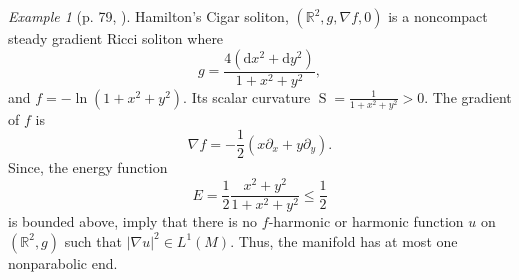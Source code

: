 \documentclass{amsart}
\newcommand{\abs}[1]{\left| #1 \right|}
\newcommand{\derivative}{\mathrm{d}}
\newcommand{\brackets}[1]{\left( #1 \right)}
\DeclareMathOperator*{\scalar}{S}
\theoremstyle{plain}
\theoremstyle{plain}
\newtheorem{corollary}{Corollary}
\theoremstyle{plain}
\theoremstyle{plain}
\theoremstyle{remark}
\newtheorem{example}{Example}
\begin{document}










\begin{example}[p. 79,  \cite{MR4624811}]\label{ex: hamilton cigar soliton}
    Hamilton's Cigar soliton, $(\mathbb{R}^2 , g, \nabla f, 0)$ is a noncompact steady gradient Ricci soliton where 
    $$ g = \frac{ 4 \left( \derivative x^2 + \derivative y^2 \right) }{1+x^2+y^2} , $$
    and $f= - \ln \brackets{ 1+ x^2 + y^2 }$. 
    Its scalar curvature $\scalar = \frac{1}{ 1+  x^2 +  y^2 } > 0$.
    The gradient of $f$ is 
    $$ \nabla f = - \frac{1}{2} (x \partial_x + y \partial_y). $$ 
    Since, the energy function 
    $$ E= \frac{1}{2} \frac{x^2 + y^2 }{1+ x^2 + y^2} \leq \frac{1}{2} $$
    is bounded above,  imply
    that there is no $f$-harmonic or harmonic function $u$ on $(\mathbb{R}^2,g)$ such that $\abs{\nabla u}^2  \in L^{1}(M)$. 
    Thus, the manifold has at most one nonparabolic end.
\end{example}
\end{document}
